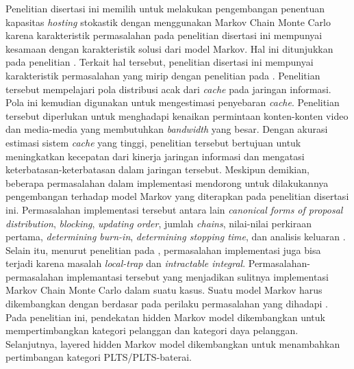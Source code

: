 {{{{{{Penelitian disertasi ini memilih untuk melakukan pengembangan penentuan kapasitas \textit{hosting} stokastik dengan menggunakan Markov Chain Monte Carlo karena karakteristik permasalahan pada penelitian disertasi ini mempunyai kesamaan dengan karakteristik solusi dari model Markov. Hal ini ditunjukkan pada penelitian \cite{Ben-Ammar2019}. Terkait hal tersebut, penelitian disertasi ini mempunyai karakteristik permasalahan yang mirip dengan penelitian pada \cite{Ben-Ammar2019}. Penelitian tersebut mempelajari pola distribusi acak dari \textit{cache} pada jaringan informasi. Pola ini kemudian digunakan untuk mengestimasi penyebaran \textit{cache}. Penelitian tersebut diperlukan untuk menghadapi kenaikan permintaan konten-konten video dan media-media yang membutuhkan \textit{bandwidth} yang besar. Dengan akurasi estimasi sistem \textit{cache} yang tinggi, penelitian tersebut bertujuan untuk meningkatkan kecepatan dari kinerja jaringan informasi dan mengatasi keterbatasan-keterbatasan dalam jaringan tersebut. Meskipun demikian, beberapa permasalahan dalam implementasi mendorong untuk dilakukannya pengembangan terhadap model Markov yang diterapkan pada penelitian disertasi ini. Permasalahan implementasi tersebut antara lain \textit{canonical forms of proposal distribution}, \textit{blocking}, \textit{updating order}, jumlah \textit{chains}, nilai-nilai perkiraan pertama, \textit{determining burn-in}, \textit{determining stopping time}, dan analisis keluaran \cite{Gilks1996}. Selain itu, menurut penelitian pada \cite{Liang2010}, permasalahan implementasi juga bisa terjadi karena masalah \textit{local-trap} dan \textit{intractable integral}. Permasalahan-permasalahan implemantasi tersebut yang menjadikan sulitnya implementasi Markov Chain Monte Carlo dalam suatu kasus. Suatu model Markov harus dikembangkan dengan berdasar pada perilaku permasalahan yang dihadapi \cite{Gilks1996,Liang2010}. Pada penelitian ini, pendekatan hidden Markov model dikembangkan untuk mempertimbangkan kategori pelanggan dan kategori daya pelanggan. Selanjutnya, layered hidden Markov model dikembangkan untuk menambahkan pertimbangan kategori PLTS/PLTS-baterai.

}}}}}}
